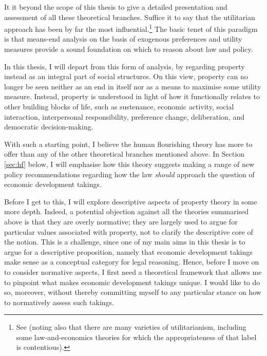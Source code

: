 It it beyond the scope of this thesis to give a detailed presentation and assessment of all these theoretical branches. Suffice it to say that the utilitarian approach has been by far the most influential.\footnote{See \cite[11]{alexander12} (noting also that there are many varieties of utilitarianism, including some law-and-economics theories for which the appropriateness of that label is contentious).} The basic tenet of this paradigm is that means-end analysis on the basis of exogenous preferences and utility measures provide a sound foundation on which to reason about law and policy.

In this thesis, I will depart from this form of analysis, by regarding property instead as an integral part of social structures. On this view,  property can no longer be seen neither as an end in itself nor as a means to maximise some utility measure. Instead, property is understood in light of how it functionally relates to other building blocks of life, such as sustenance, economic activity, social interaction, interpersonal responsibility, preference change, deliberation,  and democratic decision-making.

With such a starting point, I believe the human flourishing theory has more to offer than any of the other theoretical branches mentioned above. In Section \ref{sec:hf} below, I will emphasise how this theory suggests making a range of new policy recommendations regarding how the law {\it should} approach the question of economic development takings.

Before I get to this, I will explore descriptive aspects of property theory in some more depth. Indeed, a potential objection against all the theories summarised above is that they are overly normative; they are largely used to argue for particular values associated with property, not to clarify the descriptive core of the notion. This is a challenge, since one of my main aims in this thesis is to argue for a descriptive proposition, namely that economic development takings make sense as a conceptual category for legal reasoning. Hence, before I move on to consider normative aspects, I first need a theoretical framework that allows me to pinpoint what makes economic development takings unique. I would like to do so, moreover, without thereby committing myself to any particular stance on how to normatively assess such takings.

